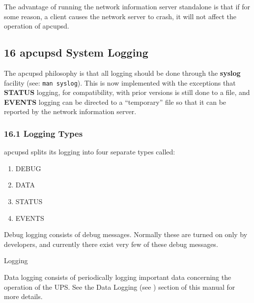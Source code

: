 The advantage of running the network information server standalone is that if
for some reason, a client causes the network server to crash, it will not
affect the operation of apcupsd. 

\label{apcupsd-System-Logging}

\subsection*{16 apcupsd System Logging}

\label{index-Logging_002c-System-166}
\label{index-System-Logging-167}
The apcupsd philosophy is that all logging should be done through the {\bf
syslog} facility (see: {\tt man syslog}). This is now implemented with the
exceptions that {\bf STATUS} logging, for compatibility, with prior versions
is still done to a file, and {\bf EVENTS} logging can be directed to a
``temporary'' file so that it can be reported by the network information
server. 

\label{Logging-Types}

\subsubsection*{16.1 Logging Types}

\label{index-Logging_002c-types-168}
apcupsd splits its logging into four separate types called:  

\begin{enumerate}
\item DEBUG  
\item DATA  
\item STATUS  
\item EVENTS  
\end{enumerate}

Debug logging consists of debug messages. Normally these are turned on only by
developers, and currently there exist very few of these debug messages. 

{\smallDATA Logging}

Data logging consists of periodically logging important data concerning the
operation of the UPS. See the Data Logging (see 
) section of this manual for more
details. 

